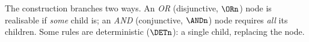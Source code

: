 The construction branches two ways. An \emph{OR} (disjunctive, $\ORn$) node is realisable if
\emph{some} child is; an \emph{AND} (conjunctive, $\ANDn$) node requires \emph{all} its children. Some
rules are deterministic ($\DETn$): a single child, replacing the node. 



%
\noindent






